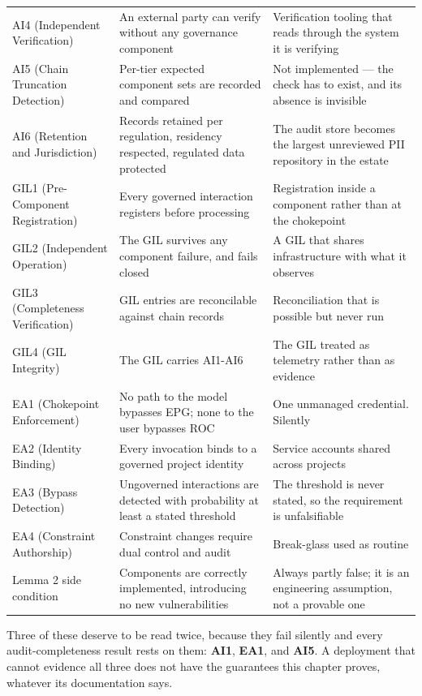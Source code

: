 \begin{longtable}{@{}>{\raggedright\arraybackslash}p{2.14cm}>{\raggedright\arraybackslash}p{5.26cm}>{\raggedright\arraybackslash}p{6.95cm}@{}}
  AI4 (Independent Verification) & An external party can verify without any governance component & Verification tooling that reads through the system it is verifying \\
  AI5 (Chain Truncation Detection) & Per-tier expected component sets are recorded and compared & Not implemented --- the check has to exist, and its absence is invisible \\
  AI6 (Retention and Jurisdiction) & Records retained per regulation, residency respected, regulated data protected & The audit store becomes the largest unreviewed PII repository in the estate \\
  GIL1 (Pre-Component Registration) & Every governed interaction registers before processing & Registration inside a component rather than at the chokepoint \\
  GIL2 (Independent Operation) & The GIL survives any component failure, and fails closed & A GIL that shares infrastructure with what it observes \\
  GIL3 (Completeness Verification) & GIL entries are reconcilable against chain records & Reconciliation that is possible but never run \\
  GIL4 (GIL Integrity) & The GIL carries AI1-AI6 & The GIL treated as telemetry rather than as evidence \\
  EA1 (Chokepoint Enforcement) & No path to the model bypasses EPG; none to the user bypasses ROC & One unmanaged credential. Silently \\
  EA2 (Identity Binding) & Every invocation binds to a governed project identity & Service accounts shared across projects \\
  EA3 (Bypass Detection) & Ungoverned interactions are detected with probability at least a stated threshold & The threshold is never stated, so the requirement is unfalsifiable \\
  EA4 (Constraint Authorship) & Constraint changes require dual control and audit & Break-glass used as routine \\
  Lemma 2 side condition & Components are correctly implemented, introducing no new vulnerabilities & Always partly false; it is an engineering assumption, not a provable one \\
\end{longtable}
\normalsize


Three of these deserve to be read twice, because they fail silently and every
audit-completeness result rests on them: \textbf{AI1}, \textbf{EA1}, and \textbf{AI5}. A
deployment that cannot evidence all three does not have the guarantees this
chapter proves, whatever its documentation says.





